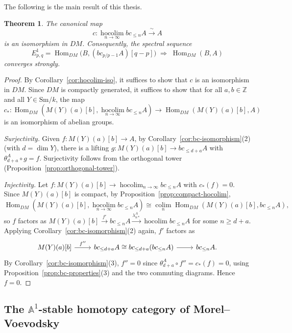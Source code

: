 \documentclass[12pt,a4paper]{article}
\newtheorem{theorem}{Theorem}[section]
\theoremstyle{definition}
\newcommand{\Sm}{\mathrm{Sm}}
\newcommand{\hocolim}{\operatorname*{hocolim}}
\newcommand{\colim}{\operatorname*{colim}}
\newcommand{\Hom}{\operatorname{Hom}}
\newcommand{\Z}{\mathbb{Z}}
\begin{document}
The following is the main result of this thesis.

\begin{theorem}\label{thm:main}
The canonical map
\[
  c:\hocolim_{n\to\infty}bc_{\leq n}A\xrightarrow{\;\sim\;} A
\]
is an isomorphism in $DM$.  Consequently, the spectral sequence
\[
  E^1_{p,q} = \Hom_{DM}\!\bigl(B,(bc_{p/p-1}A)[q-p]\bigr)
  \;\Rightarrow\;\Hom_{DM}(B,A)
\]
converges strongly.
\end{theorem}
\begin{proof}
By Corollary~\ref{cor:hocolim-iso}, it suffices to show that $c$ is an isomorphism in
$DM$.  Since $DM$ is compactly generated, it suffices to show that for all $a,b\in\Z$
and all $Y\in\Sm/k$, the map
\[
  c_*:\Hom_{DM}(M(Y)(a)[b],\hocolim_{n\to\infty}bc_{\leq n}A)
  \longrightarrow\Hom_{DM}(M(Y)(a)[b],A)
\]
is an isomorphism of abelian groups.

\textit{Surjectivity.}  Given $f:M(Y)(a)[b]\to A$, by Corollary~\ref{cor:bc-isomorphism}(2)
(with $d=\dim Y$), there is a lifting $g:M(Y)(a)[b]\to bc_{\leq d+a}A$ with
$\theta_{d+a}^A\circ g=f$.  Surjectivity follows from the orthogonal tower
(Proposition~\ref{prop:orthogonal-tower}).

\textit{Injectivity.}  Let $f:M(Y)(a)[b]\to\hocolim_{n\to\infty}bc_{\leq n}A$ with
$c_*(f)=0$.  Since $M(Y)(a)[b]$ is compact, by Proposition~\ref{prop:compact-hocolim},
\[
  \Hom_{DM}(M(Y)(a)[b],\hocolim_{n\to\infty}bc_{\leq n}A)
  \cong\colim_n\Hom_{DM}(M(Y)(a)[b],bc_{\leq n}A),
\]
so $f$ factors as $M(Y)(a)[b]\xrightarrow{f'} bc_{\leq n}A\xrightarrow{\lambda_{n*}^A}
\hocolim bc_{\leq n}A$ for some $n\geq d+a$.  Applying Corollary~\ref{cor:bc-isomorphism}(2)
again, $f'$ factors as
\[
\begin{tikzcd}
  M(Y)(a)[b] \ar[r,"f''"] & bc_{\leq d+a}A\cong bc_{\leq d+a}(bc_{\leq n}A)
    \ar[r] & bc_{\leq n}A.
\end{tikzcd}
\]
By Corollary~\ref{cor:bc-isomorphism}(3), $f''=0$ since
$\theta_{d+a}^A\circ f''= c_*(f)=0$, using Proposition~\ref{prop:bc-properties}(3)
and the two commuting diagrams.  Hence $f=0$.
\end{proof}

\subsection{The $\mathbb{A}^1$-stable homotopy category of Morel--Voevodsky}
\end{document}
